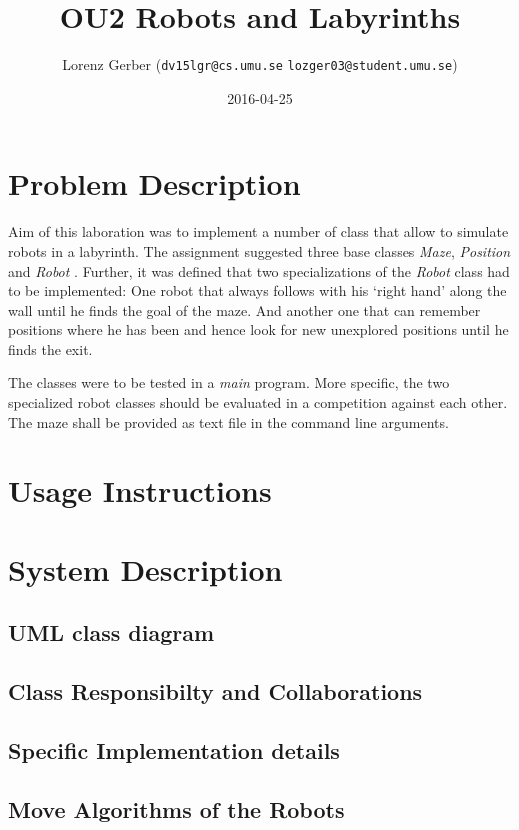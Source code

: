 \documentclass[a4paper,11pt,twoside]{article}
\title{OU2 Robots and Labyrinths}
\author{Lorenz Gerber ({\tt{dv15lgr@cs.umu.se}} {\tt{lozger03@student.umu.se}})}
\date{2016-04-25}
\begin{document}
\lstset{language=C}
\maketitle
\thispagestyle{empty}
\newpage
\tableofcontents
\thispagestyle{empty}
\newpage

\clearpage
{}

\section{Problem Description} 
Aim of this laboration was to implement a number of class that allow
to simulate robots in a labyrinth. The assignment suggested three base
classes \textit{Maze}, \textit{Position} and \textit{Robot}
\cite{maze}. Further, it was defined that two specializations of the
\textit{Robot} class had to be implemented: One robot that always
follows with his `right hand' along the wall until he finds the
goal of the maze. And another one that can remember positions where he has
been and hence look for new unexplored positions until he finds the exit.

The classes were to be tested in a \textit{main} program. More
specific, the two specialized robot classes should be evaluated in a
competition against each other. The maze shall be provided as text
file in the command line arguments. 

\section{Usage Instructions}


\section{System Description}
\subsection{UML class diagram}
\subsection{Class Responsibilty and Collaborations}
\subsection{Specific Implementation details}

\subsection{Move Algorithms of the Robots}
\end{document}
